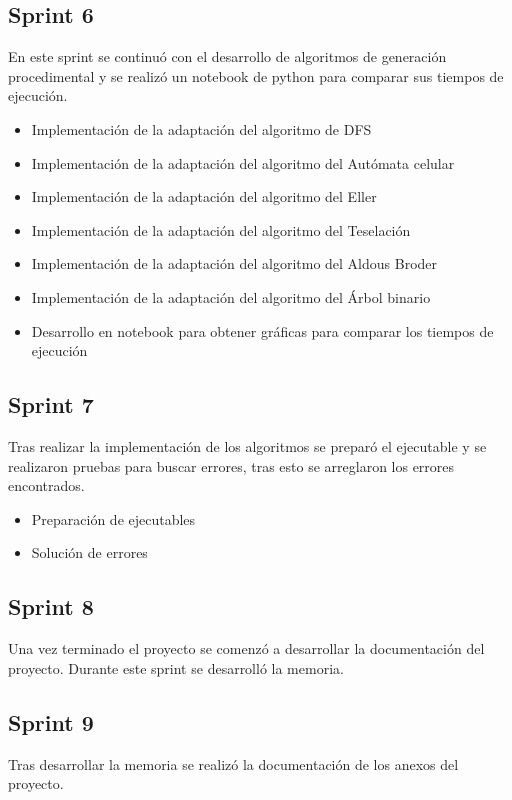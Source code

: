 \subsection{Sprint 6}
En este sprint se continuó con el desarrollo de algoritmos de generación procedimental y se realizó un notebook de python para comparar sus tiempos de ejecución.
\begin{itemize}
    \item Implementación de la adaptación del algoritmo de DFS
    \item Implementación de la adaptación del algoritmo del Autómata celular
    \item Implementación de la adaptación del algoritmo del Eller
    \item Implementación de la adaptación del algoritmo del Teselación
    \item Implementación de la adaptación del algoritmo del Aldous Broder
    \item Implementación de la adaptación del algoritmo del Árbol binario
    \item Desarrollo en notebook para obtener gráficas para comparar los tiempos de ejecución
\end{itemize}

\subsection{Sprint 7}
Tras realizar la implementación de los algoritmos se preparó el ejecutable y se realizaron pruebas para buscar errores, tras esto se arreglaron los errores encontrados.
\begin{itemize}
    \item Preparación de ejecutables
    \item Solución de errores
\end{itemize}

\subsection{Sprint 8}
Una vez terminado el proyecto se comenzó a desarrollar la documentación del proyecto. Durante este sprint se desarrolló la memoria.

\subsection{Sprint 9}
Tras desarrollar la memoria se realizó la documentación de los anexos del proyecto.

